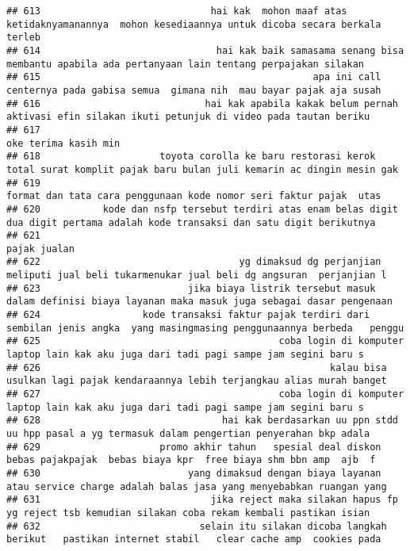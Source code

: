 \documentclass[
]{article}
\begin{document}
\begin{verbatim}
## 613                              hai kak  mohon maaf atas ketidaknyamanannya  mohon kesediaannya untuk dicoba secara berkala terleb 
## 614                               hai kak baik samasama senang bisa membantu apabila ada pertanyaan lain tentang perpajakan silakan 
## 615                                                apa ini call centernya pada gabisa semua  gimana nih  mau bayar pajak aja susah  
## 616                             hai kak apabila kakak belum pernah aktivasi efin silakan ikuti petunjuk di video pada tautan beriku 
## 617                                                                                                             oke terima kasih min
## 618                     toyota corolla ke baru restorasi kerok total surat komplit pajak baru bulan juli kemarin ac dingin mesin gak
## 619                                                              format dan tata cara penggunaan kode nomor seri faktur pajak  utas 
## 620           kode dan nsfp tersebut terdiri atas enam belas digit dua digit pertama adalah kode transaksi dan satu digit berikutnya
## 621                                                                                                                     pajak jualan
## 622                                   yg dimaksud dg perjanjian meliputi jual beli tukarmenukar jual beli dg angsuran  perjanjian l 
## 623                          jika biaya listrik tersebut masuk dalam definisi biaya layanan maka masuk juga sebagai dasar pengenaan 
## 624                  kode transaksi faktur pajak terdiri dari sembilan jenis angka  yang masingmasing penggunaannya berbeda   penggu
## 625                                          coba login di komputer laptop lain kak aku juga dari tadi pagi sampe jam segini baru s 
## 626                                                   kalau bisa usulkan lagi pajak kendaraannya lebih terjangkau alias murah banget
## 627                                          coba login di komputer laptop lain kak aku juga dari tadi pagi sampe jam segini baru s 
## 628                                hai kak berdasarkan uu ppn stdd uu hpp pasal a yg termasuk dalam pengertian penyerahan bkp adala 
## 629                     promo akhir tahun   spesial deal diskon   bebas pajakpajak  bebas biaya kpr  free biaya shm bbn amp  ajb  f 
## 630                          yang dimaksud dengan biaya layanan atau service charge adalah balas jasa yang menyebabkan ruangan yang 
## 631                              jika reject maka silakan hapus fp yg reject tsb kemudian silakan coba rekam kembali pastikan isian 
## 632                            selain itu silakan dicoba langkah berikut   pastikan internet stabil   clear cache amp  cookies pada 

\end{verbatim}
\end{document}

